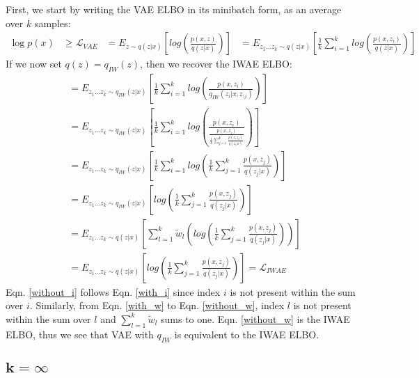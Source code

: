 \documentclass{article} %
\begin{document}
First, we start by writing the VAE ELBO in its minibatch form, as an average over $k$ samples:
\begin{align} 
    \log p(x) &\geq 
    \mathcal{L}_{VAE} &=
    E_{z \sim q(z|x)} \left[  log\left(\frac{p(x,z)}{q(z|x)} \right) \right]  
    &= E_{z_{1}...z_{k} \sim q(z|x)} \left[  \frac{1}{k}\sum_{i=1}^k log\left(\frac{p(x,z_i)}{q(z|x)} \right) \right]
\end{align}
If we now set $q(z) = q_{IW}(z)$, then we recover the IWAE ELBO:
\begin{align}
    &= E_{z_{1}...z_{k} \sim q_{IW}(z|x)} \left[  \frac{1}{k}\sum_{i=1}^k log\left(\frac{p(x,z_i)}{q_{IW}(z_i|x,z_{\setminus i})}  \right)  \right] \\
    &= E_{z_{1}...z_{k} \sim q_{IW}(z|x)} \left[  \frac{1}{k}\sum_{i=1}^k log\left(\frac{p(x,z_i)}{\frac{p(x,z_i)}{\frac{1}{k}   \sum_{j=1}^k \frac{p(x,z_j)}{q(z_j|x)}}}  \right)  \right] \\
    &= E_{z_{1}...z_{k} \sim q_{IW}(z|x)} \left[  \frac{1}{k}\sum_{i=1}^k log\left(\frac{1}{k} \sum_{j=1}^k \frac{p(x,z_j)}{q(z_j|x)}\right)  \right] \label{with_i} \\
    &= E_{z_{1}...z_{k} \sim q_{IW}(z|x)} \left[ log\left(\frac{1}{k} \sum_{j=1}^k \frac{p(x,z_j)}{q(z_j|x)}\right)  \right]  \label{without_i} \\
    &= E_{z_{1}...z_{k} \sim q(z|x)} \left[  \sum_{l=1}^k \tilde w_l  \left( log\left(\frac{1}{k} \sum_{j=1}^k \frac{p(x,z_j)}{q(z_j|x)}\right)\right)  \right] \label{with_w} \\ 
    &= E_{z_{1}...z_{k} \sim q(z|x)} \left[  log\left(\frac{1}{k}\sum_{j=1}^k \frac{p(x,z_j)}{q(z_j|x)}  \right)  \right] = \mathcal{L}_{IWAE} \label{without_w}
\end{align}
Eqn. \ref{without_i} follows Eqn. \ref{with_i} since index $i$ is not present within the sum over $i$. Similarly, from Eqn. \ref{with_w} to Eqn. \ref{without_w}, index $l$ is not present within the sum over $l$ and $\sum_{l=1}^k \tilde w_l$ sums to one. Eqn. \ref{without_w} is the IWAE ELBO, thus we see that VAE with $q_{IW}$ is equivalent to the IWAE ELBO.









\subsection{\texorpdfstring{$\boldsymbol{k=\infty}$}{k=inf}} \label{detailed_derivation}
\end{document}
